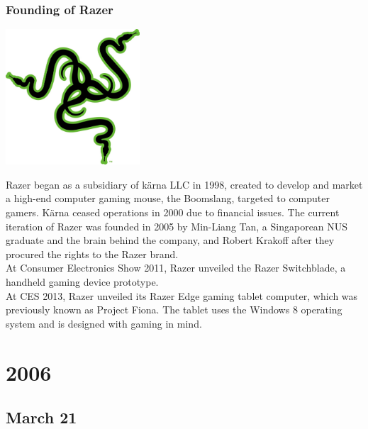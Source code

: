 \documentclass[11pt]{report}
\begin{document}
\subsection{Founding of Razer}
\vspace{2mm}\begin{center}\includegraphics[width=5cm]{./img/razerLogo.jpg}\end{center}
Razer began as a subsidiary of kärna LLC in 1998, created to develop and market a high-end computer gaming mouse, the Boomslang, targeted to computer gamers. Kärna ceased operations in 2000 due to financial issues. The current iteration of Razer was founded in 2005 by Min-Liang Tan, a Singaporean NUS graduate and the brain behind the company, and Robert Krakoff after they procured the rights to the Razer brand.\\
\indent At Consumer Electronics Show 2011, Razer unveiled the Razer Switchblade, a handheld gaming device prototype.\\
\indent 
At CES 2013, Razer unveiled its Razer Edge gaming tablet computer, which was previously known as Project Fiona. The tablet uses the Windows 8 operating system and is designed with gaming in mind.

\chapter{2006}
\section{March 21}
\end{document}
